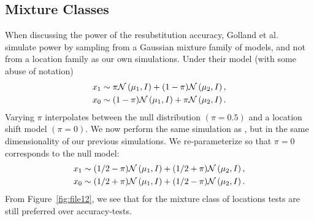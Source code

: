 \documentclass[]{bio}
\begin{document}
\subsection{Mixture Classes}


When discussing the power of the resubstitution accuracy, Golland et al.~\cite{golland_permutation_2005} simulate power by sampling from a Gaussian mixture family of models, and not from a location family as our own simulations. 
Under their model (with some abuse of notation)
\begin{align*}
\begin{split}
x_1 & \sim \pi \mathcal{N}\left(\mu_1,I\right)+ (1-\pi) \mathcal{N}\left(\mu_2,I\right), \\
x_0 & \sim (1-\pi) \mathcal{N}\left(\mu_1,I\right)+ \pi \mathcal{N}\left(\mu_2,I\right).
\end{split}
\end{align*}
Varying $\pi$ interpolates between the null distribution $(\pi=0.5)$ and a location shift model $(\pi=0)$. 
We now perform the same simulation as \cite{golland_permutation_2005}, but in the same dimensionality of our previous simulations.
We re-parameterize so that $\pi=0$ corresponds to the null model:
\begin{align}
\begin{split}
\label{eq:mixture_alternative}
x_1 & \sim (1/2-\pi) \mathcal{N}\left(\mu_1,I\right)+ (1/2+\pi) \mathcal{N}\left(\mu_2,I\right), \\
x_0 & \sim (1/2+\pi) \mathcal{N}\left(\mu_1,I\right)+ (1/2-\pi) \mathcal{N}\left(\mu_2,I\right).	
\end{split}
\end{align}
From Figure~\ref{fig:file12}, we see that for the mixture class of \cite{golland_permutation_2005} locations tests are still preferred over accuracy-tests. 
\end{document}
